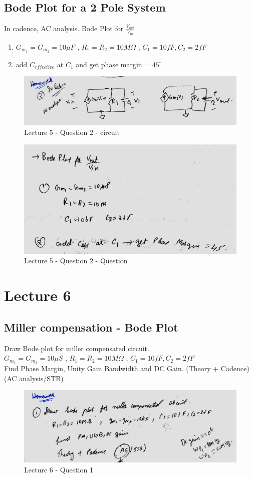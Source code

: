 \documentclass[a4paper]{article}
\begin{document}
\subsection{Bode Plot for a 2 Pole System}
In cadence, AC analysis. Bode Plot for $\frac{V_{out}}{V_{{in}}}$
\begin{enumerate}
    \item $G_{m_1} = G_{m_2} = 10 \mu F$ , $R_1 = R_2 = 10M \Omega$ , $C_1 = 10fF, C_2 = 2fF$
    \item add $C_{effective}$ at $C_1$ and get phase margin = $45^\circ$
\end{enumerate}
\begin{figure}
    \centering
    \includegraphics[width=0.8\linewidth]{images/Lec_5_Q_2_ckt.jpeg}
    \caption{Lecture 5 - Question 2 - circuit}
\end{figure}
\begin{figure}
    \centering
    \includegraphics[width=1\linewidth]{images/Lec_5_Q_2_ques.jpeg}
    \caption{Lecture 5 - Question 2 - Question}
\end{figure}
\section{Lecture 6}
\subsection{Miller compensation - Bode Plot}
Draw Bode plot for miller compensated circuit. \\ $G_{m_1} = G_{m_2} = 10 \mu S$ , $R_1 = R_2 = 10M \Omega$ , $C_1 = 10fF, C_2 = 2fF$ \\ Find Phase Margin, Unity Gain Bandwidth and DC Gain. (Theory + Cadence) (AC analysis/STB)
\begin{figure}
    \centering
    \includegraphics[width=0.8\linewidth]{images/Lec_6_Q_1.jpeg}
    \caption{Lecture 6 - Question 1}
\end{figure}
\end{document}
